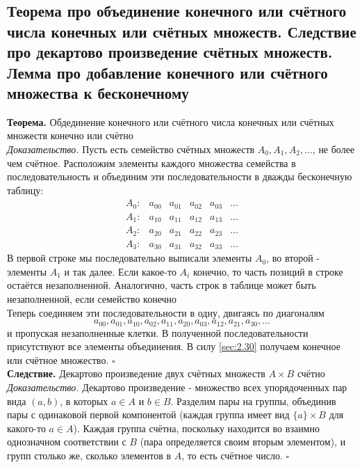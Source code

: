\documentclass[a4paper]{article}
\newcommand{\qed}{\hfill$\square$}
\begin{document}
\subsection{Теорема про объединение конечного или счётного числа конечных или счётных множеств. Следствие про декартово произведение счётных множеств. Лемма про добавление конечного или счётного множества к бесконечному}
\textbf{Теорема.} Обдединение конечного или счётного числа конечных или счётных множеств конечно или счётно\\[2mm]
\textit{Доказательство.} Пусть есть семейство счётных множеств $A_{0}, A_{1}, A_{2}, \ldots$, не более чем счётное. Расположим элементы каждого множества семейства в последовательность и объединим эти последовательности в дважды бесконечную таблицу:
$$
\begin{array}{llllll}
A_{0}: & a_{00} & a_{01} & a_{02} & a_{03} & \ldots \\
A_{1}: & a_{10} & a_{11} & a_{12} & a_{13} & \ldots \\
A_{2}: & a_{20} & a_{21} & a_{22} & a_{23} & \ldots \\
A_{3}: & a_{30} & a_{31} & a_{32} & a_{33} & \ldots
\end{array}
$$
\indent В первой строке мы последовательно выписали элементы $A_{0}$, во второй - элементы $A_{1}$ и так далее. Если какое-то $A_{i}$ конечно, то часть позиций в строке остаётся незаполненной. Аналогично, часть строк в таблице может быть незаполненной, если семейство конечно\\[2mm]
\indent Теперь соединяем эти последовательности в одну, двигаясь по диагоналям
$$
a_{00}, a_{01}, a_{10}, a_{02}, a_{11}, a_{20}, a_{03}, a_{12}, a_{21}, a_{30}, \ldots
$$
и пропуская незаполненные клетки. В полученной последовательности присутствуют все элементы объединения. В силу \ref{sec:2.30} получаем конечное или счётное множество. \qed\\[2mm]
\textbf{Следствие.} Декартово произведение двух счётных множеств $A \times B$ счётно\\[2mm]
\textit{Доказательство.} Декартово произведение - множество всех упорядоченных пар вида $(a, b)$, в которых $a \in A$ и $b \in B$. Разделим пары на группы, объединив пары с одинаковой первой компонентой (каждая группа имеет вид $\{a\} \times B$ для какого-то $a \in A$). Каждая группа счётна, поскольку находится во взаимно однозначном соответствии с $B$ (пара определяется своим вторым элементом), и групп столько же, сколько элементов в $A$, то есть счётное число. \qed\\[2mm]
\end{document}
